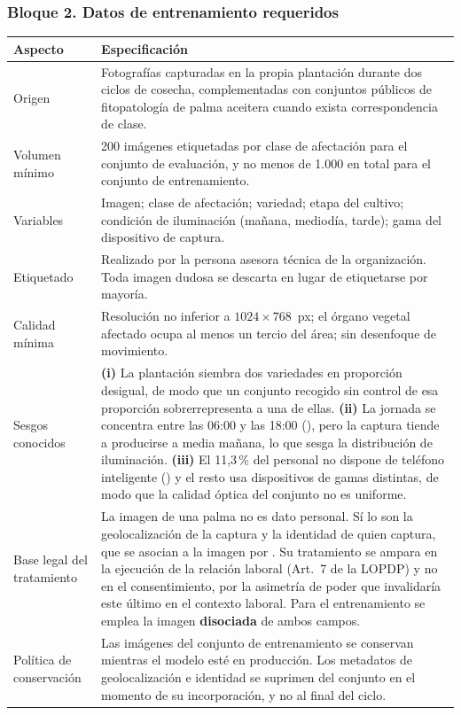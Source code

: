 \subsubsection*{Bloque 2. Datos de entrenamiento requeridos}

\begin{table}[H]
\centering\footnotesize
\begin{tabular}{|L{3.6cm}|L{11.8cm}|}
\hline
{}\textbf{Aspecto} & \textbf{Especificación}\\ \hline
Origen & Fotografías capturadas en la propia plantación durante dos ciclos de cosecha, complementadas con conjuntos públicos de fitopatología de palma aceitera cuando exista correspondencia de clase.\\ \hline
Volumen mínimo & 200 imágenes etiquetadas por clase de afectación para el conjunto de evaluación, y no menos de 1.000 en total para el conjunto de entrenamiento.\\ \hline
Variables & Imagen; clase de afectación; variedad; etapa del cultivo; condición de iluminación (mañana, mediodía, tarde); gama del dispositivo de captura.\\ \hline
Etiquetado & Realizado por la persona asesora técnica de la organización. Toda imagen dudosa se descarta en lugar de etiquetarse por mayoría.\\ \hline
Calidad mínima & Resolución no inferior a $1024\times768$~px; el órgano vegetal afectado ocupa al menos un tercio del área; sin desenfoque de movimiento.\\ \hline
Sesgos conocidos & \textbf{(i)} La plantación siembra dos variedades en proporción desigual, de modo que un conjunto recogido sin control de esa proporción sobrerrepresenta a una de ellas. \textbf{(ii)} La jornada se concentra entre las 06:00 y las 18:00 (), pero la captura tiende a producirse a media mañana, lo que sesga la distribución de iluminación. \textbf{(iii)} El 11,3\,\% del personal no dispone de teléfono inteligente () y el resto usa dispositivos de gamas distintas, de modo que la calidad óptica del conjunto no es uniforme.\\ \hline
Base legal del tratamiento & La imagen de una palma no es dato personal. Sí lo son la geolocalización de la captura y la identidad de quien captura, que se asocian a la imagen por . Su tratamiento se ampara en la ejecución de la relación laboral (Art.~7 de la LOPDP) y no en el consentimiento, por la asimetría de poder que invalidaría este último en el contexto laboral. Para el entrenamiento se emplea la imagen \textbf{disociada} de ambos campos.\\ \hline
Política de conservación & Las imágenes del conjunto de entrenamiento se conservan mientras el modelo esté en producción. Los metadatos de geolocalización e identidad se suprimen del conjunto en el momento de su incorporación, y no al final del ciclo.\\ \hline
\end{tabular}
\end{table}

